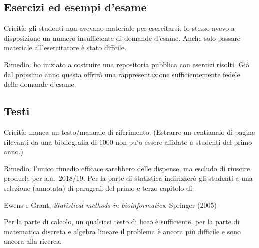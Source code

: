 \documentclass[10pt]{article}
\begin{document}
\subsection{Esercizi ed esempi d'esame}

Cricità: gli studenti non avevano materiale per esercitarsi. Io stesso avevo a disposizione un numero insufficiente di domande d'esame. Anche solo passare materiale all'esercitatore è stato diffcile.

Rimedio: ho iniziato a costruire una \href{https://github.com/domenicozambella/teaching/tree/master/Statistica}{repositoria pubblica\/} con esercizi risolti. Già dal prossimo anno questa offrirà una rappresentazione sufficientemente fedele delle domande d'esame. 


\subsection{Testi}

Cricità: manca un testo/manuale di riferimento. (Estrarre un centianaio di pagine rilevanti da una bibliografia di 1000 non pu`o essere affidato a studenti del primo anno.)

Rimedio: l'unico rimedio efficace sarebbero delle dispense, ma escludo di riuscire produrle per a.a.~2018/19. Per la parte di statistica indirizzer\`o gli studenti a una selezione (annotata) di paragrafi del primo e terzo capitolo di:

Ewens e Grant, \textit{Statistical methods in bioinformatics}. Springer (2005)

Per la parte di calcolo, un qualsiasi testo di liceo è sufficiente, per la parte di matematica discreta e algebra lineare il problema è ancora più difficile e sono ancora alla ricerca. 
\end{document}
